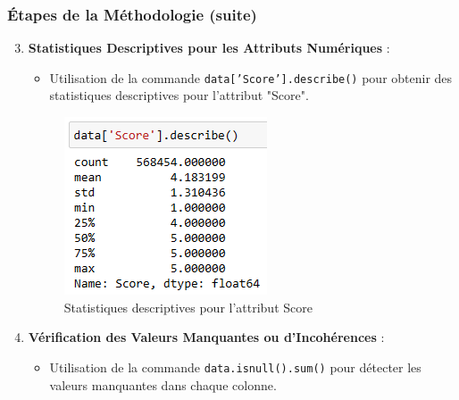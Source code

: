 \begin{frame}
    \frametitle{Étapes de la Méthodologie (suite)}

    \begin{enumerate}
        \setcounter{enumi}{2}
        \item \textbf{Statistiques Descriptives pour les Attributs Numériques} :
            \begin{itemize}
                \item Utilisation de la commande \texttt{data['Score'].describe()} pour obtenir des statistiques descriptives pour l'attribut "Score".
            \end{itemize}
            \begin{figure}[h]
                \centering
                \includegraphics[scale=0.5]{Figures/describe.PNG}
                \caption{Statistiques descriptives pour l'attribut Score}
                \label{fig:describe}
            \end{figure}
    \end{enumerate}

    \begin{enumerate}
        \setcounter{enumi}{3}
        \item \textbf{Vérification des Valeurs Manquantes ou d'Incohérences} :
            \begin{itemize}
                \item Utilisation de la commande \texttt{data.isnull().sum()} pour détecter les valeurs manquantes dans chaque colonne.
            \end{itemize}
    \end{enumerate}
\end{frame}

